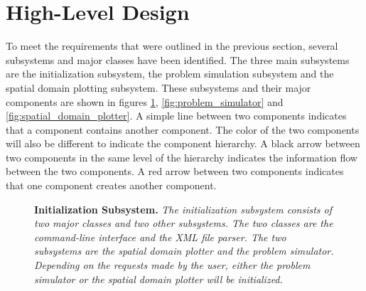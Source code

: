 \section{High-Level Design}
To meet the requirements that were outlined in the previous section, several
subsystems and major classes have been identified. The three main subsystems 
are the initialization subsystem, the problem simulation subsystem and the 
spatial domain plotting subsystem. These subsystems and their major components 
are shown in figures \ref{fig:initialization}, \ref{fig:problem_simulator} and 
\ref{fig:spatial_domain_plotter}. A simple line between two components 
indicates that a component contains another component. The color of the two 
components will also be different to indicate the component hierarchy. A black 
arrow between two components in the same level of the hierarchy indicates the 
information flow between the two components. A red arrow between two components 
indicates that one component creates another component.
\begin{figure}[t!]
  \begin{center}
  \end{center}
  \caption{\textbf{Initialization Subsystem.}
    \textit{The initialization subsystem consists of two major classes and
      two other subsystems. The two classes are the command-line interface
      and the XML file parser. The two subsystems are the spatial domain
      plotter and the problem simulator. Depending on the requests made by
      the user, either the problem simulator or the spatial domain plotter
      will be initialized.}}
  \label{fig:initialization}
\end{figure}
